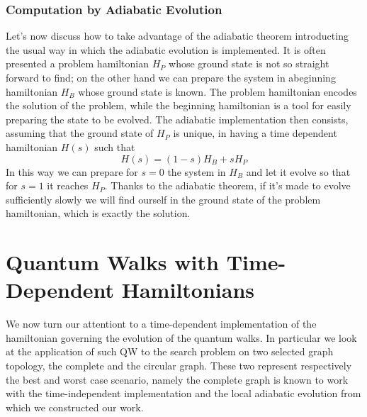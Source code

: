 \documentclass[11pt, twoside]{report}
\begin{document}
\subsection{Computation by Adiabatic Evolution}
Let's now discuss how to take advantage of the adiabatic theorem introducting the usual way in which the adiabatic evolution is implemented. It is often presented a problem hamiltonian $H_P$ whose ground state is not so straight forward to find; on the other hand we can prepare the system in abeginning hamiltonian $H_B$ whose ground state is known. The problem hamiltonian encodes the solution of the problem, while the beginning hamiltonian is a tool for easily preparing the state to be evolved. The adiabatic implementation then consists, assuming that the ground state of $H_P$ is unique, in having a time dependent hamiltonian $H(s)$ such that
\begin{equation}
    H(s) = (1-s)H_B + s H_P
\end{equation}
In this way we can prepare for $s=0$ the system in $H_B$ and let it evolve so that for $s=1$ it reaches $H_P$. Thanks to the adiabatic theorem, if it's made to evolve sufficiently slowly we will find ourself in the ground state of the problem hamiltonian, which is exactly the solution.



\newpage
\thispagestyle{empty}
\chapter{Quantum Walks with Time-Dependent Hamiltonians}
We now turn our attentiont to a time-dependent implementation of the hamiltonian governing the evolution of the quantum walks. In particular we look at the application of such QW to the search problem on two selected graph topology, the complete and the circular graph. These two represent respectively the best and worst case scenario, namely the complete graph is known to work with the time-independent implementation \cite{Childs2004} and the local adiabatic evolution \cite{Roland2002} from which we constructed our work.
\end{document}
